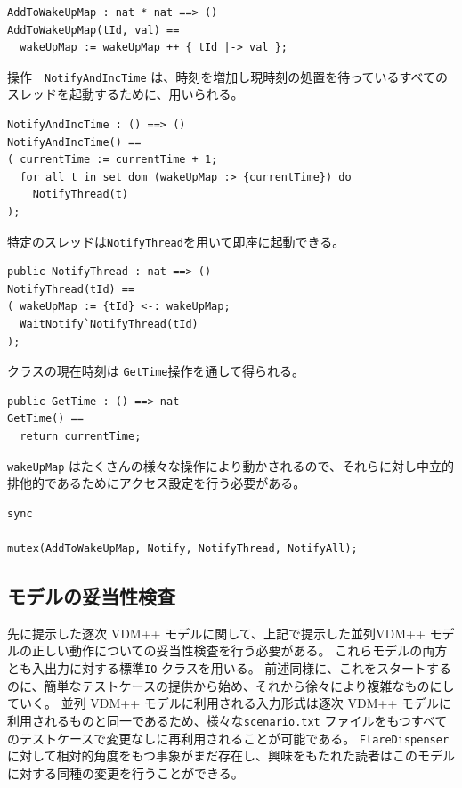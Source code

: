 \documentclass[\pformat,12pt]{jreport}
\begin{document}
\begin{lstlisting}
AddToWakeUpMap : nat * nat ==> ()
AddToWakeUpMap(tId, val) ==
  wakeUpMap := wakeUpMap ++ { tId |-> val };
\end{lstlisting}

操作　\texttt{NotifyAndIncTime} は、時刻を増加し現時刻の処置を待っているすべてのスレッドを起動するために、用いられる。

\begin{lstlisting}
NotifyAndIncTime : () ==> ()
NotifyAndIncTime() ==
( currentTime := currentTime + 1;
  for all t in set dom (wakeUpMap :> {currentTime}) do
    NotifyThread(t)
);
\end{lstlisting}

特定のスレッドは\texttt{NotifyThread}を用いて即座に起動できる。

\begin{lstlisting}
public NotifyThread : nat ==> ()
NotifyThread(tId) ==
( wakeUpMap := {tId} <-: wakeUpMap;
  WaitNotify`NotifyThread(tId)
);
\end{lstlisting}

クラスの現在時刻は \texttt{GetTime}操作を通して得られる。

\begin{lstlisting}
public GetTime : () ==> nat
GetTime() ==
  return currentTime;
\end{lstlisting}

 \texttt{wakeUpMap} はたくさんの様々な操作により動かされるので、それらに対し中立的排他的であるためにアクセス設定を行う必要がある。

\begin{lstlisting}
sync

mutex(AddToWakeUpMap, Notify, NotifyThread, NotifyAll);
\end{lstlisting}





\subsection{モデルの妥当性検査}

先に提示した逐次 VDM++ モデルに関して、上記で提示した並列VDM++ モデルの正しい動作についての妥当性検査を行う必要がある。
これらモデルの両方とも入出力に対する標準\texttt{IO} クラスを用いる。
前述同様に、これをスタートするのに、簡単なテストケースの提供から始め、それから徐々により複雑なものにしていく。
並列 VDM++ モデルに利用される入力形式は逐次 VDM++ モデルに利用されるものと同一であるため、様々な\texttt{scenario.txt} ファイルをもつすべてのテストケースで変更なしに再利用されることが可能である。
 \texttt{FlareDispenser}に対して相対的角度をもつ事象がまだ存在し、興味をもたれた読者はこのモデルに対する同種の変更を行うことができる。
\end{document}

